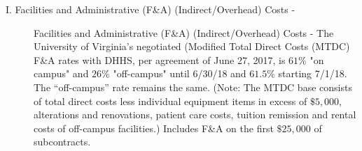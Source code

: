 \begin{description}
\item[I. Facilities and Administrative (F\&A) (Indirect/Overhead) Costs - ]
Facilities and Administrative (F\&A) (Indirect/Overhead) Costs - The University of Virginia's negotiated (Modified Total Direct Costs (MTDC) F\&A rates with DHHS, per agreement of June 27, 2017, is $61\%$ "on campus" and $26\%$ "off-campus" until 6/30/18 and $61.5\%$ starting 7/1/18.  The “off-campus” rate remains the same.  (Note: The MTDC base consists of total direct costs less individual equipment items in excess of $\$5,000$, alterations and renovations, patient care costs, tuition remission and rental costs of off-campus facilities.)  Includes F\&A on the first $\$25,000$ of subcontracts.

\end{description}